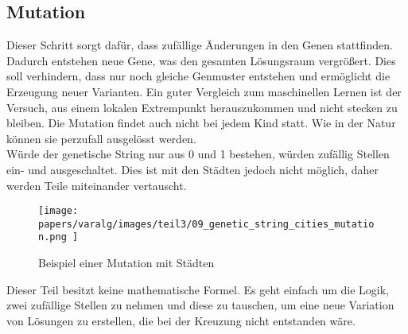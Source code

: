 %
%
%
%
\subsection{Mutation
\label{buch:paper:varalg:subsection:mutation}}
Dieser Schritt sorgt dafür, dass zufällige Änderungen in 
den Genen stattfinden. Dadurch entstehen neue Gene, was den 
gesamten Lösungsraum vergrößert. Dies soll verhindern, 
dass nur noch gleiche Genmuster entstehen und ermöglicht 
die Erzeugung neuer Varianten. Ein guter Vergleich zum 
maschinellen Lernen ist der Versuch, aus einem lokalen 
Extrempunkt herauszukommen und nicht stecken zu bleiben.
Die Mutation findet auch nicht bei jedem Kind statt. Wie 
in der Natur können sie perzufall ausgelösst werden.
\\
Würde der genetische String nur aus 0 und 1 bestehen, 
würden zufällig Stellen ein- und ausgeschaltet. Dies 
ist mit den Städten jedoch nicht möglich, daher werden 
Teile miteinander vertauscht.

\begin{figure}
	\centering
	\texttt{[image: 
        papers/varalg/images/teil3/09\_genetic\_string\_cities\_mutation.png
        ]}
	\caption{Beispiel einer Mutation mit Städten}
	\label{fig:mutation_genetic_string}
\end{figure}

Dieser Teil besitzt keine mathematische Formel. Es geht einfach 
um die Logik, zwei zufällige Stellen zu nehmen und diese zu 
tauschen, um eine neue Variation von Lösungen zu erstellen, die 
bei der Kreuzung nicht entstanden wäre.

